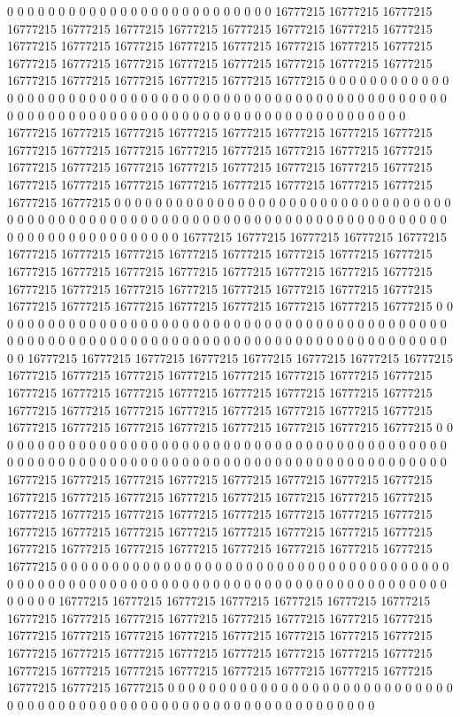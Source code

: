 0 0 0 0 0 0 0 0 0 0 0 0 0 0 0 0 0 0 0 0 0 0 0 0 0 0 16777215 16777215 16777215 16777215 16777215 16777215 16777215 16777215 16777215 16777215 16777215 16777215 16777215 16777215 16777215 16777215 16777215 16777215 16777215 16777215 16777215 16777215 16777215 16777215 16777215 16777215 16777215 16777215 16777215 16777215 16777215 16777215 16777215 0 0 0 0 0 0 0 0 0 0 0 0 0 0 0 0 0 0 0 0 0 0 0 0 0 0 0 0 0 0 0 0 0 0 0 0 0 0 0 0 0 0 0 0 0 0 0 0 0 0 0 0 0 0 0 0 0 0 0 0 0 0 0 0 0 0 0 0 0
0 0 0 0 0 0 0 0 0 0 0 0 0 0 0 0 0 0 0 0 0 0 0 0 0 16777215 16777215 16777215 16777215 16777215 16777215 16777215 16777215 16777215 16777215 16777215 16777215 16777215 16777215 16777215 16777215 16777215 16777215 16777215 16777215 16777215 16777215 16777215 16777215 16777215 16777215 16777215 16777215 16777215 16777215 16777215 16777215 16777215 16777215 0 0 0 0 0 0 0 0 0 0 0 0 0 0 0 0 0 0 0 0 0 0 0 0 0 0 0 0 0 0 0 0 0 0 0 0 0 0 0 0 0 0 0 0 0 0 0 0 0 0 0 0 0 0 0 0 0 0 0 0 0 0 0 0 0 0 0 0 0
0 0 0 0 0 0 0 0 0 0 0 0 0 0 0 0 0 0 0 0 0 0 0 0 16777215 16777215 16777215 16777215 16777215 16777215 16777215 16777215 16777215 16777215 16777215 16777215 16777215 16777215 16777215 16777215 16777215 16777215 16777215 16777215 16777215 16777215 16777215 16777215 16777215 16777215 16777215 16777215 16777215 16777215 16777215 16777215 16777215 16777215 16777215 16777215 16777215 0 0 0 0 0 0 0 0 0 0 0 0 0 0 0 0 0 0 0 0 0 0 0 0 0 0 0 0 0 0 0 0 0 0 0 0 0 0 0 0 0 0 0 0 0 0 0 0 0 0 0 0 0 0 0 0 0 0 0 0 0 0 0 0 0 0 0
0 0 0 0 0 0 0 0 0 0 0 0 0 0 0 0 0 0 0 0 0 0 0 16777215 16777215 16777215 16777215 16777215 16777215 16777215 16777215 16777215 16777215 16777215 16777215 16777215 16777215 16777215 16777215 16777215 16777215 16777215 16777215 16777215 16777215 16777215 16777215 16777215 16777215 16777215 16777215 16777215 16777215 16777215 16777215 16777215 16777215 16777215 16777215 16777215 16777215 16777215 16777215 0 0 0 0 0 0 0 0 0 0 0 0 0 0 0 0 0 0 0 0 0 0 0 0 0 0 0 0 0 0 0 0 0 0 0 0 0 0 0 0 0 0 0 0 0 0 0 0 0 0 0 0 0 0 0 0 0 0 0 0 0 0 0 0 0
0 0 0 0 0 0 0 0 0 0 0 0 0 0 0 0 0 0 0 0 0 0 0 16777215 16777215 16777215 16777215 16777215 16777215 16777215 16777215 16777215 16777215 16777215 16777215 16777215 16777215 16777215 16777215 16777215 16777215 16777215 16777215 16777215 16777215 16777215 16777215 16777215 16777215 16777215 16777215 16777215 16777215 16777215 16777215 16777215 16777215 16777215 16777215 16777215 16777215 16777215 16777215 16777215 0 0 0 0 0 0 0 0 0 0 0 0 0 0 0 0 0 0 0 0 0 0 0 0 0 0 0 0 0 0 0 0 0 0 0 0 0 0 0 0 0 0 0 0 0 0 0 0 0 0 0 0 0 0 0 0 0 0 0 0 0 0 0 0
0 0 0 0 0 0 0 0 0 0 0 0 0 0 0 0 0 0 0 0 0 0 16777215 16777215 16777215 16777215 16777215 16777215 16777215 16777215 16777215 16777215 16777215 16777215 16777215 16777215 16777215 16777215 16777215 16777215 16777215 16777215 16777215 16777215 16777215 16777215 16777215 16777215 16777215 16777215 16777215 16777215 16777215 16777215 16777215 16777215 16777215 16777215 16777215 16777215 16777215 16777215 16777215 16777215 0 0 0 0 0 0 0 0 0 0 0 0 0 0 0 0 0 0 0 0 0 0 0 0 0 0 0 0 0 0 0 0 0 0 0 0 0 0 0 0 0 0 0 0 0 0 0 0 0 0 0 0 0 0 0 0 0 0 0 0 0 0 0 0
